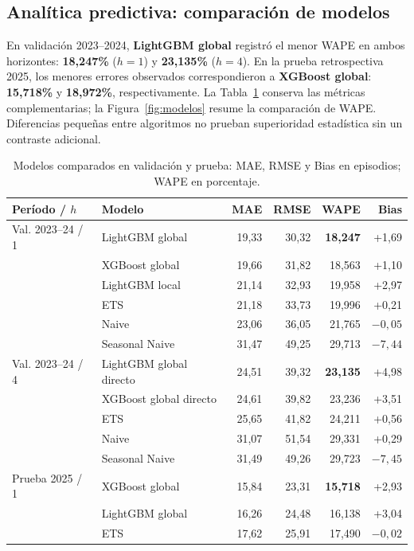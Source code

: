 \documentclass[10pt,a4paper]{article}
\begin{document}
\subsection{Analítica predictiva: comparación de modelos}

En validación 2023--2024, \textbf{LightGBM global} registró el menor WAPE en ambos horizontes: \textbf{18,247\%} ($h=1$) y \textbf{23,135\%} ($h=4$). En la prueba retrospectiva 2025, los menores errores observados correspondieron a \textbf{XGBoost global}: \textbf{15,718\%} y \textbf{18,972\%}, respectivamente. La Tabla~\ref{tab:modelos} conserva las métricas complementarias; la Figura~\ref{fig:modelos} resume la comparación de WAPE. Diferencias pequeñas entre algoritmos no prueban superioridad estadística sin un contraste adicional.

\begin{table}[htbp]
\centering
\caption{Modelos comparados en validación y prueba: MAE, RMSE y Bias en episodios; WAPE en porcentaje.}
\label{tab:modelos}
\footnotesize
\setlength{\tabcolsep}{4pt}
\begin{tabular}{llrrrr}
\toprule
\textbf{Período / $h$} & \textbf{Modelo} & \textbf{MAE} & \textbf{RMSE} & \textbf{WAPE} & \textbf{Bias}\\
\midrule
Val. 2023--24 / 1 & LightGBM global & 19,33 & 30,32 & \textbf{18,247} & +1,69\\
 & XGBoost global & 19,66 & 31,82 & 18,563 & +1,10\\
 & LightGBM local & 21,14 & 32,93 & 19,958 & +2,97\\
 & ETS & 21,18 & 33,73 & 19,996 & +0,21\\
 & Naive & 23,06 & 36,05 & 21,765 & $-0,05$\\
 & Seasonal Naive & 31,47 & 49,25 & 29,713 & $-7,44$\\
\midrule
Val. 2023--24 / 4 & LightGBM global directo & 24,51 & 39,32 & \textbf{23,135} & +4,98\\
 & XGBoost global directo & 24,61 & 39,82 & 23,236 & +3,51\\
 & ETS & 25,65 & 41,82 & 24,211 & +0,56\\
 & Naive & 31,07 & 51,54 & 29,331 & +0,29\\
 & Seasonal Naive & 31,49 & 49,26 & 29,723 & $-7,45$\\
\midrule
Prueba 2025 / 1 & XGBoost global & 15,84 & 23,31 & \textbf{15,718} & +2,93\\
 & LightGBM global & 16,26 & 24,48 & 16,138 & +3,04\\
 & ETS & 17,62 & 25,91 & 17,490 & $-0,02$\\

\end{tabular}
\end{table}
\end{document}
